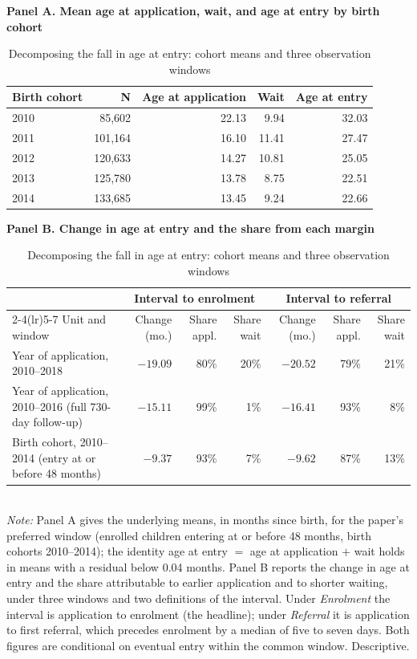 \begin{table}[htbp]\centering
\caption{Decomposing the fall in age at entry: cohort means and three observation windows}
\label{tab:S3decomp}
\small
\textbf{Panel A. Mean age at application, wait, and age at entry by birth cohort}\\[3pt]
\begin{tabular}{lrrrr}
\toprule
Birth cohort & N & Age at application & Wait & Age at entry \\
\midrule
2010 & 85,602 & 22.13 & 9.94 & 32.03 \\
2011 & 101,164 & 16.10 & 11.41 & 27.47 \\
2012 & 120,633 & 14.27 & 10.81 & 25.05 \\
2013 & 125,780 & 13.78 & 8.75 & 22.51 \\
2014 & 133,685 & 13.45 & 9.24 & 22.66 \\
\bottomrule
\end{tabular}

\vspace{7pt}
\textbf{Panel B. Change in age at entry and the share from each margin}\\[3pt]
\setlength{\tabcolsep}{4pt}
\begin{tabular}{p{4.6cm}rrrrrr}
\toprule
 & \multicolumn{3}{c}{Interval to enrolment} & \multicolumn{3}{c}{Interval to referral} \\
\cmidrule(lr){2-4}\cmidrule(lr){5-7}
Unit and window & Change (mo.) & Share appl. & Share wait & Change (mo.) & Share appl. & Share wait \\
\midrule
Year of application, 2010--2018 & $-19.09$ & 80\% & 20\% & $-20.52$ & 79\% & 21\% \\
Year of application, 2010--2016 (full 730-day follow-up) & $-15.11$ & 99\% & 1\% & $-16.41$ & 93\% & 8\% \\
Birth cohort, 2010--2014 (entry at or before 48 months) & $-9.37$ & 93\% & 7\% & $-9.62$ & 87\% & 13\% \\
\bottomrule
\end{tabular}
\\[3pt]{\footnotesize \textit{Note:} Panel A gives the underlying means, in months since birth, for the paper's preferred window (enrolled children entering at or before 48 months, birth cohorts 2010--2014); the identity age at entry $=$ age at application $+$ wait holds in means with a residual below 0.04 months. Panel B reports the change in age at entry and the share attributable to earlier application and to shorter waiting, under three windows and two definitions of the interval. Under \emph{Enrolment} the interval is application to enrolment (the headline); under \emph{Referral} it is application to first referral, which precedes enrolment by a median of five to seven days. Both figures are conditional on eventual entry within the common window. Descriptive.}
\end{table}
